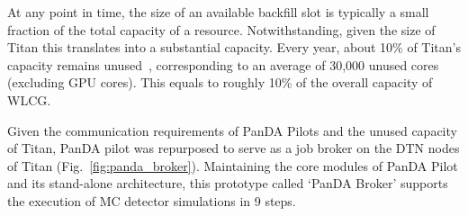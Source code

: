 At any point in time, the size of an available backfill slot is typically a
small fraction of the total capacity of a resource. Notwithstanding, given
the size of Titan this translates into a substantial capacity. Every year,
about 10\% of Titan's capacity remains unused~\cite{barker2016us},
corresponding to an average of 30,000 unused cores (excluding GPU cores).
This equals to roughly 10\% of the overall capacity of WLCG\@.

Given the communication requirements of PanDA Pilots and the unused capacity
of Titan, PanDA pilot was repurposed to serve as a job broker on the DTN
nodes of Titan (Fig.~\ref{fig:panda_broker}). Maintaining the core modules of
PanDA Pilot and its stand-alone architecture, this prototype called `PanDA
Broker' 
%
%
%
%
supports the execution of MC detector simulations in 9 steps. 

